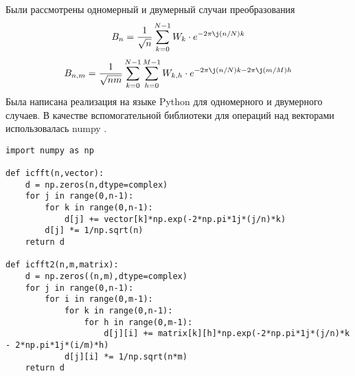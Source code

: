 Были рассмотрены одномерный и двумерный случаи преобразования
\begin{equation*}
	B_n =\frac{1}{\sqrt{n}} \sum_{k=0}^{N-1} W_k \cdot e^{-2\pi\j (n/N)k}
\end{equation*}
\begin{equation*}
	B_{n,m} =\frac{1}{\sqrt{nm}} \sum_{k=0}^{N-1}\sum_{h=0}^{M-1} W_{k,h} \cdot e^{-2\pi\j (n/N)k -2\pi\j(m/M)h} 
\end{equation*}
Была написана реализация на языке Python для одномерного и двумерного случаев. В качестве вспомогательной библиотеки для операций над векторами использовалась numpy \cite{harris2020array}.
\begin{lstlisting}
import numpy as np

def icfft(n,vector):
	d = np.zeros(n,dtype=complex)
	for j in range(0,n-1):
		for k in range(0,n-1):
			d[j] += vector[k]*np.exp(-2*np.pi*1j*(j/n)*k)
		d[j] *= 1/np.sqrt(n)
	return d

def icfft2(n,m,matrix):
	d = np.zeros((n,m),dtype=complex)
	for j in range(0,n-1):
		for i in range(0,m-1):
			for k in range(0,n-1):
				for h in range(0,m-1):
					d[j][i] += matrix[k][h]*np.exp(-2*np.pi*1j*(j/n)*k - 2*np.pi*1j*(i/m)*h)
			d[j][i] *= 1/np.sqrt(n*m)
	return d
\end{lstlisting}

